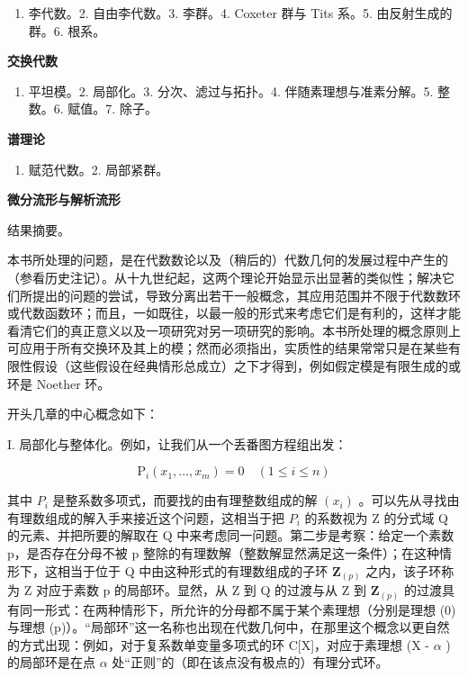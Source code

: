 \begin{enumerate}
\def\labelenumi{\arabic{enumi}.}
\tightlist
\item
  李代数。2. 自由李代数。3. 李群。4. Coxeter 群与 Tits 系。5. 由反射生成的群。6. 根系。
\end{enumerate}

\textbf{交换代数}\par

\begin{enumerate}
\def\labelenumi{\arabic{enumi}.}
\tightlist
\item
  平坦模。2. 局部化。3. 分次、滤过与拓扑。4. 伴随素理想与准素分解。5. 整数。6. 赋值。7. 除子。
\end{enumerate}

\textbf{谱理论}\par

\begin{enumerate}
\def\labelenumi{\arabic{enumi}.}
\tightlist
\item
  赋范代数。2. 局部紧群。
\end{enumerate}

\textbf{微分流形与解析流形}\par

结果摘要。


本书所处理的问题，是在代数数论以及（稍后的）代数几何的发展过程中产生的（参看历史注记）。从十九世纪起，这两个理论开始显示出显著的类似性；解决它们所提出的问题的尝试，导致分离出若干一般概念，其应用范围并不限于代数数环或代数函数环；而且，一如既往，以最一般的形式来考虑它们是有利的，这样才能看清它们的真正意义以及一项研究对另一项研究的影响。本书所处理的概念原则上可应用于所有交换环及其上的模；然而必须指出，实质性的结果常常只是在某些有限性假设（这些假设在经典情形总成立）之下才得到，例如假定模是有限生成的或环是 Noether 环。

开头几章的中心概念如下：

I. 局部化与整体化。例如，让我们从一个丢番图方程组出发：

\[
\mathrm{P} _ {i} (x _ {1}, \dots , x _ {m}) = 0 \quad (1 \leqslant i \leqslant n)\tag{*}
\]

其中 \(P_{i}\) 是整系数多项式，而要找的由有理整数组成的解 \((x_{i})\) 。可以先从寻找由有理数组成的解入手来接近这个问题，这相当于把 \(P_{i}\) 的系数视为 Z 的分式域 Q 的元素、并把所要的解取在 Q 中来考虑同一问题。第二步是考察：给定一个素数 p，是否存在分母不被 p 整除的有理数解（整数解显然满足这一条件）；在这种情形下，这相当于位于 Q 中由这种形式的有理数组成的子环 \(\mathbf{Z}_{(p)}\) 之内，该子环称为 Z 对应于素数 p 的局部环。显然，从 Z 到 Q 的过渡与从 Z 到 \(\mathbf{Z}_{(p)}\) 的过渡具有同一形式：在两种情形下，所允许的分母都不属于某个素理想（分别是理想 (0) 与理想 (p)）。“局部环”这一名称也出现在代数几何中，在那里这个概念以更自然的方式出现：例如，对于复系数单变量多项式的环 C{[}X{]}，对应于素理想 (X - \(\alpha\) ) 的局部环是在点 \(\alpha\) 处“正则”的（即在该点没有极点的）有理分式环。

